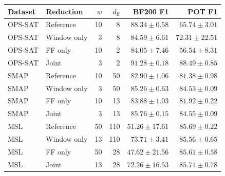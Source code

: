 \begin{tabular}{@{}llrrrr@{}}
\toprule
Dataset & Reduction & \(w\) & \(d_{\mathrm{ff}}\) & BF200 F1 & \acs{POT} F1 \\
\midrule
\acs{OPS-SAT} & Reference & \num{10} & \num{8} & \(\num{88.34}\pm\num{0.58}\) & \(\num{65.74}\pm\num{3.01}\) \\
\acs{OPS-SAT} & Window only & \num{3} & \num{8} & \(\num{84.59}\pm\num{6.61}\) & \(\num{72.31}\pm\num{22.51}\) \\
\acs{OPS-SAT} & FF only & \num{10} & \num{2} & \(\num{84.05}\pm\num{7.46}\) & \(\num{56.54}\pm\num{8.31}\) \\
\acs{OPS-SAT} & Joint & \num{3} & \num{2} & \(\num{91.28}\pm\num{0.18}\) & \(\num{88.49}\pm\num{0.85}\) \\
\addlinespace
\acs{SMAP} & Reference & \num{10} & \num{50} & \(\num{82.90}\pm\num{1.06}\) & \(\num{81.38}\pm\num{0.98}\) \\
\acs{SMAP} & Window only & \num{3} & \num{50} & \(\num{85.26}\pm\num{0.63}\) & \(\num{84.53}\pm\num{0.09}\) \\
\acs{SMAP} & FF only & \num{10} & \num{13} & \(\num{83.88}\pm\num{1.03}\) & \(\num{81.92}\pm\num{0.22}\) \\
\acs{SMAP} & Joint & \num{3} & \num{13} & \(\num{85.76}\pm\num{0.15}\) & \(\num{84.55}\pm\num{0.09}\) \\
\addlinespace
\acs{MSL} & Reference & \num{50} & \num{110} & \(\num{51.26}\pm\num{17.61}\) & \(\num{85.69}\pm\num{0.22}\) \\
\acs{MSL} & Window only & \num{13} & \num{110} & \(\num{73.71}\pm\num{3.41}\) & \(\num{85.56}\pm\num{0.65}\) \\
\acs{MSL} & FF only & \num{50} & \num{28} & \(\num{47.62}\pm\num{21.56}\) & \(\num{85.61}\pm\num{0.58}\) \\
\acs{MSL} & Joint & \num{13} & \num{28} & \(\num{72.26}\pm\num{16.53}\) & \(\num{85.71}\pm\num{0.78}\) \\
\bottomrule
\end{tabular}
